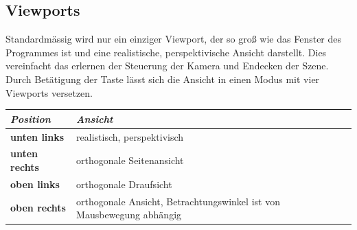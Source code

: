 \documentclass{article}
\begin{document}
\subsection{Viewports}
Standardmässig wird nur ein einziger Viewport, der so groß wie das Fenster des Programmes ist und eine realistische,
perspektivische Ansicht darstellt. Dies vereinfacht das erlernen der Steuerung der Kamera
und Endecken der Szene. Durch Betätigung der Taste  lässt sich die Ansicht in einen Modus
mit vier Viewports versetzen.
\begin{table}[H]
\begin{tabular}{|l|l|}
\hline
\textit{\textbf{Position}} & \textit{\textbf{Ansicht}}   \\ \hline
\textbf{unten links}       & realistisch, perspektivisch \\ \hline
\textbf{unten rechts}      & orthogonale Seitenansicht   \\ \hline
\textbf{oben links}        & orthogonale Draufsicht      \\ \hline
\textbf{oben rechts} & orthogonale Ansicht,  Betrachtungswinkel ist von Mausbewegung abhängig \\ \hline
\end{tabular}
\end{table}
\end{document}
